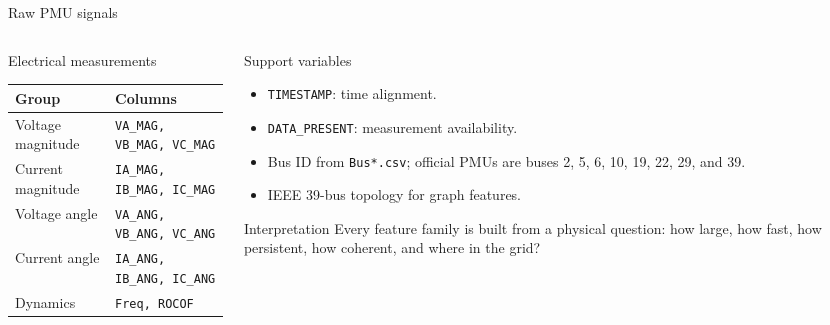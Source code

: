 ﻿\documentclass[10pt,aspectratio=169]{beamer}
\newcommand{\code}[1]{\texttt{\footnotesize #1}}
\begin{document}
\iffalse
\begin{frame}{Raw PMU signals}
\small
\begin{columns}[T,totalwidth=\textwidth]
\begin{column}{0.49\textwidth}
\begin{block}{Electrical measurements}
\begin{tabular}{ll}
\toprule
Group & Columns\\
\midrule
Voltage magnitude & \code{VA\_MAG, VB\_MAG, VC\_MAG}\\
Current magnitude & \code{IA\_MAG, IB\_MAG, IC\_MAG}\\
Voltage angle & \code{VA\_ANG, VB\_ANG, VC\_ANG}\\
Current angle & \code{IA\_ANG, IB\_ANG, IC\_ANG}\\
Dynamics & \code{Freq, ROCOF}\\
\bottomrule
\end{tabular}
\end{block}
\end{column}
\begin{column}{0.47\textwidth}
\begin{block}{Support variables}
\begin{itemize}
  \item \code{TIMESTAMP}: time alignment.
  \item \code{DATA\_PRESENT}: measurement availability.
  \item Bus ID from \code{Bus*.csv}; official PMUs are buses 2, 5, 6, 10, 19, 22, 29, and 39.
  \item IEEE 39-bus topology for graph features.
\end{itemize}
\end{block}
\begin{exampleblock}{Interpretation}
Every feature family is built from a physical question: how large, how fast, how persistent, how coherent, and where in the grid?
\end{exampleblock}
\end{column}
\end{columns}
\end{frame}
\end{document}
